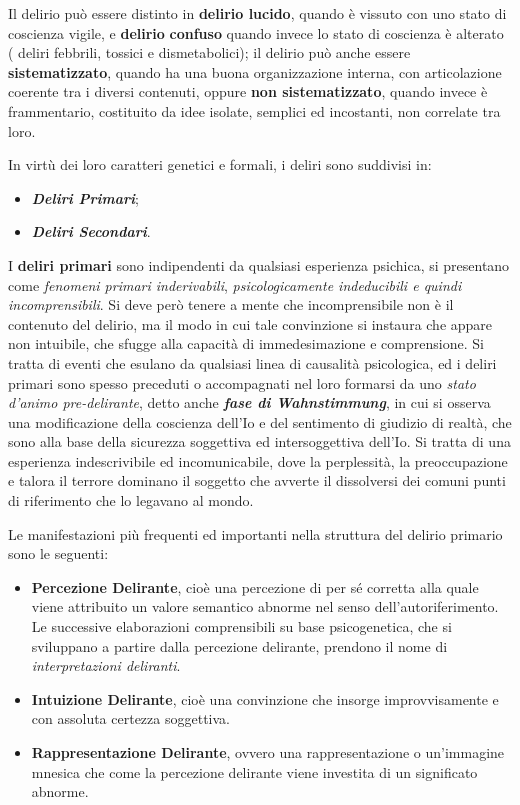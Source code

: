 Il delirio può essere distinto in \textbf{delirio lucido}, quando è
vissuto con uno stato di coscienza vigile, e \textbf{delirio}
\textbf{confuso} quando invece lo stato di coscienza è alterato ( deliri
febbrili, tossici e dismetabolici); il delirio può anche essere
\textbf{sistematizzato}, quando ha una buona organizzazione interna, con
articolazione coerente tra i diversi contenuti, oppure \textbf{non
sistematizzato}, quando invece è frammentario, costituito da idee
isolate, semplici ed incostanti, non correlate tra loro.

In virtù dei loro caratteri genetici e formali, i deliri sono suddivisi
in:

\begin{itemize}
\item
  \textbf{\emph{Deliri Primari}};
\item
  \textbf{\emph{Deliri Secondari}}.
\end{itemize}

I \textbf{deliri primari} sono indipendenti da qualsiasi esperienza
psichica, si presentano come \emph{fenomeni primari inderivabili},
\emph{psicologicamente indeducibili e quindi incomprensibili}. Si deve
però tenere a mente che incomprensibile non è il contenuto del delirio,
ma il modo in cui tale convinzione si instaura che appare non intuibile,
che sfugge alla capacità di immedesimazione e comprensione. Si tratta di
eventi che esulano da qualsiasi linea di causalità psicologica, ed i
deliri primari sono spesso preceduti o accompagnati nel loro formarsi da
uno \emph{stato d'animo pre-delirante}, detto anche \textbf{\emph{fase
di Wahnstimmung}}, in cui si osserva una modificazione della coscienza
dell'Io e del sentimento di giudizio di realtà, che sono alla base della
sicurezza soggettiva ed intersoggettiva dell'Io. Si tratta di una
esperienza indescrivibile ed incomunicabile, dove la perplessità, la
preoccupazione e talora il terrore dominano il soggetto che avverte il
dissolversi dei comuni punti di riferimento che lo legavano al mondo.

Le manifestazioni più frequenti ed importanti nella struttura del
delirio primario sono le seguenti:

\begin{itemize}
\item
  \textbf{Percezione Delirante}, cioè una percezione di per sé corretta
  alla quale viene attribuito un valore semantico abnorme nel senso
  dell'autoriferimento. Le successive elaborazioni comprensibili su base
  psicogenetica, che si sviluppano a partire dalla percezione delirante,
  prendono il nome di \emph{interpretazioni deliranti}.
\item
  \textbf{Intuizione Delirante}, cioè una convinzione che insorge
  improvvisamente e con assoluta certezza soggettiva.
\item
  \textbf{Rappresentazione Delirante}, ovvero una rappresentazione o
  un'immagine mnesica che come la percezione delirante viene investita
  di un significato abnorme.
\end{itemize}

